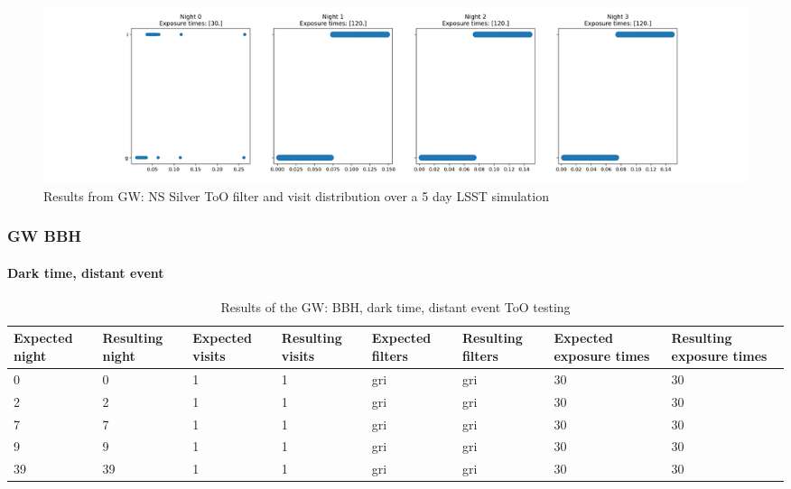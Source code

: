 \begin{figure}
    \centering
    \includegraphics[width=\linewidth]{figures/validationTests/SVRequired/GWSilverFilterPlot.png}
    \caption{Results from GW: NS Silver ToO filter and visit distribution over a 5 day LSST simulation}
    \label{fig:GWSilverFilterResult}
\end{figure}
\newpage
\subsubsection{GW BBH}

\paragraph{Dark time, distant event}

\begin{table}[h]
\centering
\begin{adjustbox}{max width=\textwidth}
\begin{tabular}{|l|l|l|l|l|l|l|l|}
\hline
Expected night & Resulting night & Expected visits & Resulting visits & Expected filters & Resulting filters & Expected exposure times & Resulting exposure times \\ \hline
0              & 0               & 1               & 1                & gri              & gri               & 30                      & 30                       \\ \hline
2              & 2               & 1               & 1                & gri              & gri               & 30                      & 30                       \\ \hline
7              & 7               & 1               & 1                & gri              & gri               & 30                      & 30                       \\ \hline
9              & 9               & 1               & 1                & gri              & gri               & 30                      & 30                       \\ \hline
39             & 39              & 1               & 1                & gri              & gri               & 30                      & 30                       \\ \hline
\end{tabular}
\end{adjustbox}
\caption{Results of the GW: BBH, dark time, distant event ToO testing}
\label{tab:GWBBHDarkFarResults}
\end{table}

